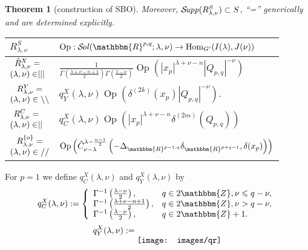 \documentclass[portrait,final,paperwidth=90cm,paperheight=120cm,fontscale=0.3]{baposter}
\newcommand{\tmop}[1]{\ensuremath{\operatorname{#1}}}
\newtheorem{theorem}{Theorem}
\newcommand{\Sol}{\mathcal{S}\!{\it ol}}
\newcommand{\Supp}{\mathcal{S}\!{\it upp}}
\theoremstyle{definition}
\renewcommand{\Q}{Q_{p,q}}
\newcommand{\mm}{\mid\mid}
\newcommand{\bb}{\backslash\backslash}
\renewcommand{\ss}{//}
\begin{document}
\begin{poster}
{\begin{theorem}[construction of SBO]
	Moreover, $\Supp(R_{\lambda,\nu}^S)\subset S$, ``='' generically and are determined explicitly.\\
	\newcommand{\mystack}[2]{\begin{array}{@{}c@{}}#1\\#2\end{array}}
	\begin{tabular}{@{}|@{}b{1.6cm}@{}|@{}l@{}|}
  \hline
  $R_{\lambda,\nu}^S$& $\tmop{Op} : 
  \Sol(\mathbbm{R}^{p, q} ; \lambda, \nu)
  \rightarrow \tmop{Hom}_{G'} (I (\lambda), J (\nu))$\\
  \hline
  $\mystack{\tilde{R}^X_{\lambda, \nu} =}{(\lambda,\nu)\in\mid\mid\mid}$ & $\frac{1}{\Gamma \left( \frac{\lambda + \nu - n + 1}{2}
  \right) \Gamma \left( \frac{1 - \nu}{2} \right)}{\tmop{Op} \left( | x_p |^{\lambda +
  \nu - n} | \Q |^{- \nu}\right)} $ \\
  \hline
  $\mystack{R_{\lambda, \nu}^Y =}{(\lambda,\nu)\in\bb}$ & ${ q_Y^X (\lambda, \nu)}{\tmop{Op} \left( \delta^{(2k)}(x_p)
  | \Q |^{- \nu}  \right)}$.\\
  \hline
  $\mystack{R_{\lambda, \nu}^C =}{(\lambda,\nu)\in\mm}$ & $q_C^X (\lambda, \nu){\tmop{Op} \left( | x_p |^{\lambda + \nu - n}\delta^{(2m)}\left( \Q \right)
    \right)}$ \\
  \hline
  $\mystack{R_{\lambda, \nu}^{\{ o \}} =}{(\lambda,\nu)\in\ss}$ & 
  $\tmop{Op} \left( \tilde{C}_{\nu -
  \lambda}^{\lambda - \frac{n - 1}{2}} \left(-\Delta_{\mathbbm{R}^{p - 1, q}}
  \delta_{\mathbbm{R}^{p + q - 1}}, \delta (x_p)\right) \right)$\\
  \hline
\end{tabular}
\end{theorem}
For $p=1$ we define $q_C^X(\lambda,\nu)$ and $q_Y^X(\lambda,\nu)$ by
\[ q_C^X (\lambda, \nu) : = \left\{ \begin{array}{ll}
		\Gamma^{-1} \left(\frac{\lambda-\nu}{2} \right), & q \in
     2\mathbbm{Z}, \nu \leqslant q - \nu,\\
     \Gamma^{-1} \left( \frac{\lambda + \nu-n+1}{2} \right), & q \in 2\mathbbm{Z},
     \nu > q - \nu,\\
     \Gamma^{-1} \left( \frac{\lambda - \nu}{2} \right), & q \in
     2\mathbbm{Z}+ 1.
   \end{array} \right. \]
   \[q_Y^X (\lambda, \nu) : = \raisebox{-0.4cm}{\mbox{\texttt{[image: images/qr]}}}\]
}


\end{poster}
\end{document}
